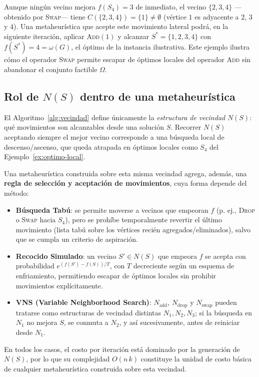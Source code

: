 \documentclass[letterpaper,12pt]{article}
\newcounter{ejemplo}
\begin{document}
Aunque ningún vecino mejora $f(S_4)=3$ de inmediato, el vecino $\{2,3,4\}$ —obtenido por \textsc{Swap}— tiene $C(\{2,3,4\})=\{1\}\neq\emptyset$ (vértice $1$ es adyacente a $2$, $3$ y $4$). Una metaheurística que acepte este movimiento lateral podrá, en la siguiente iteración, aplicar \textsc{Add}$(1)$ y alcanzar $S^*=\{1,2,3,4\}$ con $f(S^*)=4=\omega(G)$, el óptimo de la instancia ilustrativa. Este ejemplo ilustra cómo el operador \textsc{Swap} permite escapar de óptimos locales del operador \textsc{Add} sin abandonar el conjunto factible $\Omega$.

\subsection{Rol de \texorpdfstring{$N(S)$}{N(S)} dentro de una metaheurística}

El Algoritmo~\ref{alg:vecindad} define únicamente la \emph{estructura de vecindad} $N(S)$: qué movimientos son alcanzables desde una solución $S$. Recorrer $N(S)$ aceptando siempre el mejor vecino corresponde a una búsqueda local de descenso/ascenso, que queda atrapada en óptimos locales como $S_4$ del Ejemplo~\ref{ex:optimo-local}.

Una metaheurística construida sobre esta misma vecindad agrega, además, una \textbf{regla de selección y aceptación de movimientos}, cuya forma depende del método:

\begin{itemize}
    \item \textbf{Búsqueda Tabú}: se permite moverse a vecinos que empeoran $f$ (p. ej., \textsc{Drop} o \textsc{Swap} hacia $S_4$), pero se prohíbe temporalmente revertir el último movimiento (lista tabú sobre los vértices recién agregados/eliminados), salvo que se cumpla un criterio de aspiración.
    \item \textbf{Recocido Simulado}: un vecino $S' \in N(S)$ que empeora $f$ se acepta con probabilidad $e^{(f(S')-f(S))/T}$, con $T$ decreciente según un esquema de enfriamiento, permitiendo escapar de óptimos locales sin prohibir movimientos explícitamente.
    \item \textbf{VNS (Variable Neighborhood Search)}: $N_{\text{add}}$, $N_{\text{drop}}$ y $N_{\text{swap}}$ pueden tratarse como estructuras de vecindad distintas $N_1, N_2, N_3$; si la búsqueda en $N_1$ no mejora $S$, se conmuta a $N_2$, y así sucesivamente, antes de reiniciar desde $N_1$.
\end{itemize}

En todos los casos, el costo por iteración está dominado por la generación de $N(S)$, por lo que su complejidad $O(n\,k)$ constituye la unidad de costo básica de cualquier metaheurística construida sobre esta vecindad.

\clearpage
{}
\printbibliography
\end{document}
